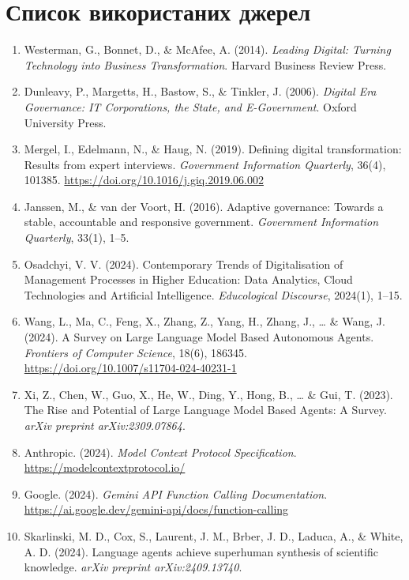 \section*{Список використаних джерел}

\begin{enumerate}[leftmargin=*,itemsep=0.4em]
\item Westerman, G., Bonnet, D., \& McAfee, A. (2014). \textit{Leading Digital: Turning Technology into Business Transformation}. Harvard Business Review Press.
\item Dunleavy, P., Margetts, H., Bastow, S., \& Tinkler, J. (2006). \textit{Digital Era Governance: IT Corporations, the State, and E-Government}. Oxford University Press.
\item Mergel, I., Edelmann, N., \& Haug, N. (2019). Defining digital transformation: Results from expert interviews. \textit{Government Information Quarterly}, 36(4), 101385. \url{https://doi.org/10.1016/j.giq.2019.06.002}
\item Janssen, M., \& van der Voort, H. (2016). Adaptive governance: Towards a stable, accountable and responsive government. \textit{Government Information Quarterly}, 33(1), 1--5.
\item Osadchyi, V. V. (2024). Contemporary Trends of Digitalisation of Management Processes in Higher Education: Data Analytics, Cloud Technologies and Artificial Intelligence. \textit{Educological Discourse}, 2024(1), 1--15.
\item Wang, L., Ma, C., Feng, X., Zhang, Z., Yang, H., Zhang, J., \ldots{} \& Wang, J. (2024). A Survey on Large Language Model Based Autonomous Agents. \textit{Frontiers of Computer Science}, 18(6), 186345. \url{https://doi.org/10.1007/s11704-024-40231-1}
\item Xi, Z., Chen, W., Guo, X., He, W., Ding, Y., Hong, B., \ldots{} \& Gui, T. (2023). The Rise and Potential of Large Language Model Based Agents: A Survey. \textit{arXiv preprint arXiv:2309.07864}.
\item Anthropic. (2024). \textit{Model Context Protocol Specification}. \url{https://modelcontextprotocol.io/}
\item Google. (2024). \textit{Gemini API Function Calling Documentation}. \url{https://ai.google.dev/gemini-api/docs/function-calling}
\item Skarlinski, M. D., Cox, S., Laurent, J. M., Brber, J. D., Laduca, A., \& White, A. D. (2024). Language agents achieve superhuman synthesis of scientific knowledge. \textit{arXiv preprint arXiv:2409.13740}.

\end{enumerate}
